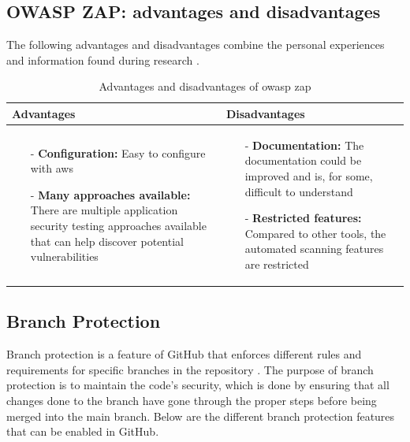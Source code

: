 \subsection{OWASP ZAP: advantages and disadvantages}
The following advantages and disadvantages combine the personal experiences and information found during research \cite{prosconsZAP}.
\begin{table}[H]
    \begin{threeparttable}
        \begin{tabular}{|>{\raggedright\arraybackslash}p{6cm}|>{\raggedright\arraybackslash}p{6cm}|}
            \hline
            \textbf{Advantages} & \textbf{Disadvantages} \\
            \hline
            \begin{itemize}
                \item [-]\textbf{Configuration:} Easy to configure with \acrshort{aws}
                \vspace{5pt}
                \item [-]\textbf{Many approaches available:} There are multiple application security testing approaches available that can help discover potential vulnerabilities
            \end{itemize}
            &
            \begin{itemize}
                \item [-] \textbf{Documentation:} The documentation could be improved and is, for some, difficult to understand
                \vspace{5pt}
                \item [-]\textbf{Restricted features:} Compared to other tools, the automated scanning features are restricted
            \end{itemize}
            \\
            \hline
        \end{tabular}
            \caption{Advantages and disadvantages of \acrshort{owasp} \acrshort{zap}}
    \end{threeparttable}
\end{table}



 
\newpage
\subsection{Branch Protection}
\label{branchprotection}
Branch protection is a feature of GitHub that enforces different rules and requirements for specific branches in the repository \cite{ProtectedBranches}. The purpose of branch protection is to maintain the code's security, which is done by ensuring that all changes done to the branch have gone through the proper steps before being merged into the main branch. Below are the different branch protection features that can be enabled in GitHub. 

